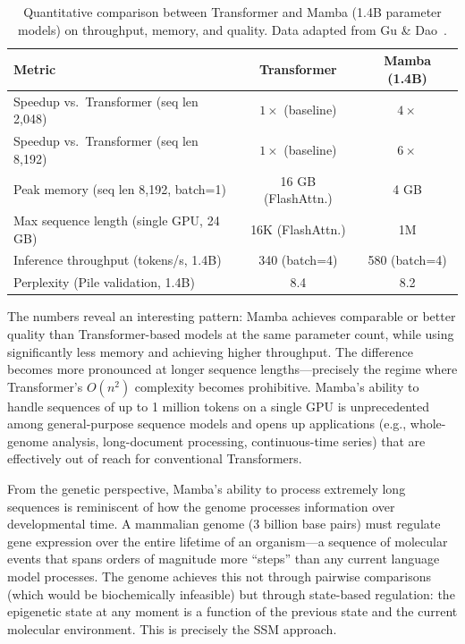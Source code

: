 \documentclass[12pt,a4paper]{article}
\begin{document}
\begin{table}[htbp]
\centering
\caption{Quantitative comparison between Transformer and Mamba (1.4B parameter models) on throughput, memory, and quality. Data adapted from Gu \& Dao~\cite{gu2023mamba}.}
\label{tab:benchmark}
\begin{tabular}{lcc}
\toprule
\textbf{Metric} & \textbf{Transformer} & \textbf{Mamba (1.4B)} \\
\midrule
Speedup vs.\ Transformer (seq len 2,048) & $1\times$ (baseline) & $4\times$ \\
Speedup vs.\ Transformer (seq len 8,192) & $1\times$ (baseline) & $6\times$ \\
Peak memory (seq len 8,192, batch=1) & 16 GB (FlashAttn.) & 4 GB \\
Max sequence length (single GPU, 24 GB) & 16K (FlashAttn.) & 1M \\
Inference throughput (tokens/s, 1.4B) & 340 (batch=4) & 580 (batch=4) \\
Perplexity (Pile validation, 1.4B) & 8.4 & 8.2 \\
\bottomrule
\end{tabular}
\end{table}

The numbers reveal an interesting pattern: Mamba achieves comparable or better quality than Transformer-based models at the same parameter count, while using significantly less memory and achieving higher throughput. The difference becomes more pronounced at longer sequence lengths---precisely the regime where Transformer's $O(n^2)$ complexity becomes prohibitive. Mamba's ability to handle sequences of up to 1 million tokens on a single GPU is unprecedented among general-purpose sequence models and opens up applications (e.g., whole-genome analysis, long-document processing, continuous-time series) that are effectively out of reach for conventional Transformers.

From the genetic perspective, Mamba's ability to process extremely long sequences is reminiscent of how the genome processes information over developmental time. A mammalian genome (3 billion base pairs) must regulate gene expression over the entire lifetime of an organism---a sequence of molecular events that spans orders of magnitude more ``steps'' than any current language model processes. The genome achieves this not through pairwise comparisons (which would be biochemically infeasible) but through state-based regulation: the epigenetic state at any moment is a function of the previous state and the current molecular environment. This is precisely the SSM approach.
\end{document}
